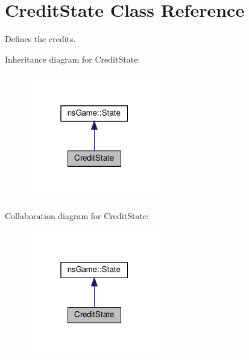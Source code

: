 \hypertarget{class_credit_state}{}\section{Credit\+State Class Reference}
\label{class_credit_state}


Defines the credits.  




Inheritance diagram for Credit\+State\+:\nopagebreak
\begin{figure}[H]
\begin{center}
\leavevmode
\includegraphics[width=163pt]{class_credit_state__inherit__graph}
\end{center}
\end{figure}


Collaboration diagram for Credit\+State\+:\nopagebreak
\begin{figure}[H]
\begin{center}
\leavevmode
\includegraphics[width=163pt]{class_credit_state__coll__graph}
\end{center}
\end{figure}
